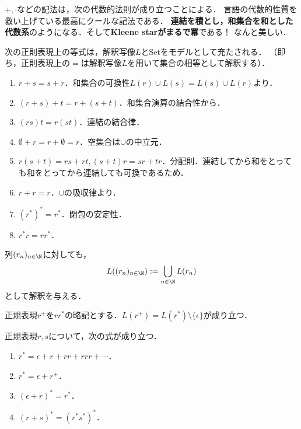 \begin{tcolorbox}[colframe=ForestGreen, colback=ForestGreen!10!white, breakable,
    title=正則表現があからさまにするもの]
    $+,\cdot$などの記法は，次の代数的法則が成り立つことによる．
    言語の代数的性質を救い上げている最高にクールな記法である．
    \textbf{連結を積とし，和集合を和とした代数系}のようになる．そして\textbf{Kleene starがまるで冪}である！
    なんと美しい．
\end{tcolorbox}

\begin{lemma}
    次の正則表現上の等式は，解釈写像$L$とSetをモデルとして充たされる．
    （即ち，正則表現上の$=$は解釈写像$L$を用いて集合の相等として解釈する）．
    \begin{enumerate}
        \item $r+s=s+r$．和集合の可換性$L(r)\cup L(s)=L(s)\cup L(r)$より．
        \item $(r+s)+t=r+(s+t)$．和集合演算の結合性から．
        \item $(rs)t=r(st)$．連結の結合律．
        \item $\emptyset+r=r+\emptyset=r$．空集合は$\cup$の中立元．
        \item $r(s+t)=rs+rt, (s+t)r=sr+tr$．分配則．連結してから和をとっても和をとってから連結しても可換であるため．
        \item $r+r=r$．$\cup$の吸収律より．
        \item $(r^*)^*=r^*$．閉包の安定性．
        \item $r^*r=rr^*$．
    \end{enumerate}
\end{lemma}

\begin{definition}
    列$(r_n)_{n\in\N}$に対しても，
    \[ L((r_n)_{n\in\N}):=\bigcup_{n\in\N}L(r_n) \]
    として解釈を与える．
\end{definition}

\begin{notation}
    正規表現$r^+$を$rr^*$の略記とする．$L(r^+)=L(r^*)\setminus\{\epsilon\}$が成り立つ．
\end{notation}

\begin{lemma}[展開法則]
    正規表現$r,s$について，次の式が成り立つ．
    \begin{enumerate}
        \item $r^*=\epsilon+r+rr+rrr+\cdots$．
        \item $r^*=\epsilon+r^+$．
        \item $(\epsilon+r)^*=r^*$．
        \item $(r+s)^*=(r^*s^*)^*$．
    \end{enumerate}
\end{lemma}

